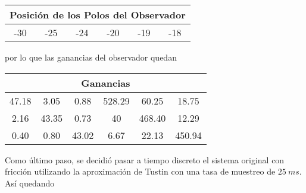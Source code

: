 \begin{table}[H]
\centering
\begin{tabular}{@{}cccccc@{}}
\toprule
\multicolumn{6}{c}{Posición de los Polos del Observador} \\ \midrule
-30    & -25    & -24    & -20    & -19    & -18   \\ \bottomrule
\end{tabular}
\end{table}
\label{tab:obsv}

por lo que las ganancias del observador quedan

\begin{table}[H]
\centering
\begin{tabular}{@{}cccccc@{}}
\toprule
\multicolumn{6}{c}{Ganancias}                    \\ \midrule
47.18 & 3.05  & 0.88  & 528.29 & 60.25  & 18.75  \\
2.16  & 43.35 & 0.73  & 40     & 468.40 & 12.29  \\
0.40  & 0.80  & 43.02 & 6.67   & 22.13  & 450.94 \\ \bottomrule
\end{tabular}
\end{table}


Como último paso, se decidió pasar a tiempo discreto el sistema original con fricción utilizando la aproximación de Tustin con una tasa de muestreo de $25 \ ms$. Así quedando

